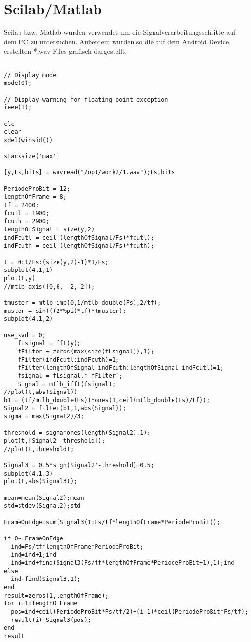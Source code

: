 \documentclass[10pt]{article}
\begin{document}
\part{Scilab/Matlab}
Scilab bzw. Matlab wurden verwendet um die Signalverarbeitungsschritte auf dem PC zu untersuchen. Außerdem wurden so die auf dem Android Device erstellten *.wav Files grafisch dargestellt.
\begin{tiny}
\begin{lstlisting}

// Display mode
mode(0);

// Display warning for floating point exception
ieee(1);

clc
clear
xdel(winsid())

stacksize('max')

[y,Fs,bits] = wavread("/opt/work2/1.wav");Fs,bits

PeriodeProBit = 12;
lengthOfFrame = 8;
tf = 2400;
fcutl = 1900;
fcuth = 2900;
lengthOfSignal = size(y,2)
indFcutl = ceil((lengthOfSignal/Fs)*fcutl);
indFcuth = ceil((lengthOfSignal/Fs)*fcuth);

t = 0:1/Fs:(size(y,2)-1)*1/Fs;
subplot(4,1,1)
plot(t,y)
//mtlb_axis([0,6, -2, 2]);

tmuster = mtlb_imp(0,1/mtlb_double(Fs),2/tf);
muster = sin(((2*%pi)*tf)*tmuster);
subplot(4,1,2)

use_svd = 0;
    fLsignal = fft(y);
    fFilter = zeros(max(size(fLsignal)),1);
    fFilter(indFcutl:indFcuth)=1;
    fFilter(lengthOfSignal-indFcuth:lengthOfSignal-indFcutl)=1;
    fsignal = fLsignal.* fFilter';
    Signal = mtlb_ifft(fsignal);
//plot(t,abs(Signal))
b1 = (tf/mtlb_double(Fs))*ones(1,ceil(mtlb_double(Fs)/tf));
Signal2 = filter(b1,1,abs(Signal));
sigma = max(Signal2)/3;

threshold = sigma*ones(length(Signal2),1);
plot(t,[Signal2' threshold]);
//plot(t,threshold);

Signal3 = 0.5*sign(Signal2'-threshold)+0.5;
subplot(4,1,3)
plot(t,abs(Signal3));

mean=mean(Signal2);mean
std=stdev(Signal2);std

FrameOnEdge=sum(Signal3(1:Fs/tf*lengthOfFrame*PeriodeProBit));

if 0~=FrameOnEdge
  ind=Fs/tf*lengthOfFrame*PeriodeProBit;
  ind=ind+1;ind
  ind=ind+find(Signal3(Fs/tf*lengthOfFrame*PeriodeProBit+1),1);ind
else
  ind=find(Signal3,1);
end
result=zeros(1,lengthOfFrame);
for i=1:lengthOfFrame
  pos=ind+ceil(PeriodeProBit*Fs/tf/2)+(i-1)*ceil(PeriodeProBit*Fs/tf);
  result(i)=Signal3(pos);
end
result

\end{lstlisting}
\end{tiny}
\end{document}
